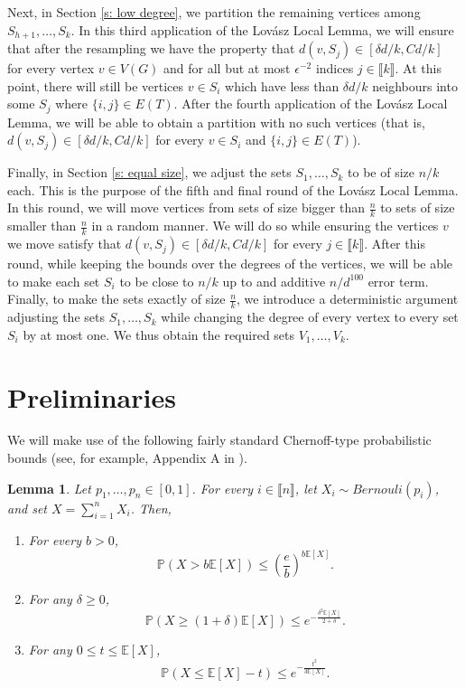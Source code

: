 \documentclass[notitlepage]{scrartcl}
\newcommand{\br}[1]{\llbracket{#1}\rrbracket}
\newtheorem{lemma}[thm]{Lemma}
\renewcommand{\Pr}{\mathbb{P}}
\begin{document}
Next, in Section \ref{s: low degree}, we partition the remaining vertices among $S_{h+1}, \dots, S_k$. In this third application of the Lov\'asz Local Lemma, we will ensure that after the resampling we have the property that $d(v, S_j) \in [\delta d/k, Cd/k]$ for every vertex $v \in V(G)$ and for all but at most $\epsilon^{-2}$ indices $j \in \br{k}$. At this point, there will still be vertices $v \in S_i$ which have less than $\delta d/k$ neighbours into some $S_j$ where $\{i,j\}\in E(T)$. After the fourth application of the Lov\'asz Local Lemma, we will be able to obtain a partition with no such vertices (that is, $d(v, S_j) \in [\delta d/k, Cd/k]$ for every $v\in S_i$ and $\{i,j\}\in E(T)$).

Finally, in Section \ref{s: equal size}, we adjust the sets $S_1, \dots, S_k$ to be of size $n/k$ each. This is the purpose of the fifth and final round of the Lov\'asz Local Lemma. In this round, we will move vertices from sets of size bigger than $\frac{n}{k}$ to sets of size smaller than $\frac{n}{k}$ in a random manner. We will do so while ensuring the vertices $v$ we move satisfy that $d(v, S_j)\in [\delta d/k, Cd/k]$ for every $j\in \br{k}$. After this round, while keeping the bounds over the degrees of the vertices, we will be able to make each set $S_i$ to be close to $n/k$ up to and additive $n/d^{100}$ error term. Finally, to make the sets exactly of size $\frac{n}{k}$, we introduce a deterministic argument adjusting the sets $S_1,\ldots,S_k$ while changing the degree of every vertex to every set $S_i$ by at most one. We thus obtain the required sets $V_1,\ldots, V_k$.




\section{Preliminaries}\label{s: prelim}
We will make use of the following fairly standard Chernoff-type probabilistic bounds (see, for example, Appendix A in \cite{AS16}).
\begin{lemma}\label{lemma:binomial-bounds}
Let $p_1,\ldots, p_n\in [0,1]$. For every $i\in \br{n}$, let $X_i\sim Bernouli(p_i)$, and set $X=\sum_{i=1}^nX_i$. Then,
\begin{enumerate}
    \item For every $b > 0$, 
    \[
        \Pr(X > b\mathbb{E}[X]) \le \left(\frac{e}{b}\right)^{b\mathbb{E}[X]}.
    \]
    \item For any $\delta\ge 0$,
    \[
        \Pr\left(X\ge (1+\delta)\mathbb{E}[X]\right)\le e^{-\frac{\delta^2\mathbb{E}[X]}{2+\delta}}.
    \]
    \item For any $0\le t \le \mathbb{E}[X]$,
    \[
        \Pr\left(X\le \mathbb{E}[X]-t\right)\le e^{-\frac{t^2}{3\mathbb{E}[X]}}.
    \]
\end{enumerate}
\end{lemma}
\end{document}
